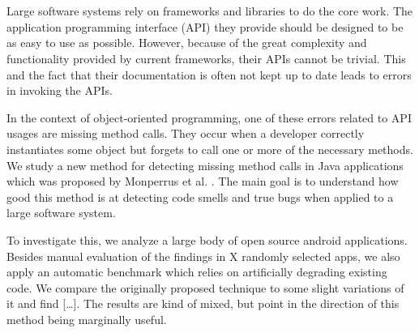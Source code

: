 \chapter{\abstractname}


Large software systems rely on frameworks and libraries to do the core work.
The application programming interface (API) they provide should be designed to be as easy to use as possible.
However, because of the great complexity and functionality provided by current frameworks, their APIs cannot be trivial.
This and the fact that their documentation is often not kept up to date leads to errors in invoking the APIs.

In the context of object-oriented programming, one of these errors related to API usages are missing method calls.
They occur when a developer correctly instantiates some object but forgets to call one or more of the necessary methods.
We study a new method for detecting missing method calls in Java applications which was proposed by Monperrus et al. \cite{monperrus2010detecting}.
The main goal is to understand how good this method is at detecting code smells and true bugs when applied to a large software system.

To investigate this, we analyze a large body of open source android applications.
Besides manual evaluation of the findings in X randomly selected apps, we also apply an automatic benchmark which relies on artificially degrading existing code.
We compare the originally proposed technique to some slight variations of it and find [\ldots].
The results are kind of mixed, but point in the direction of this method being marginally useful.
